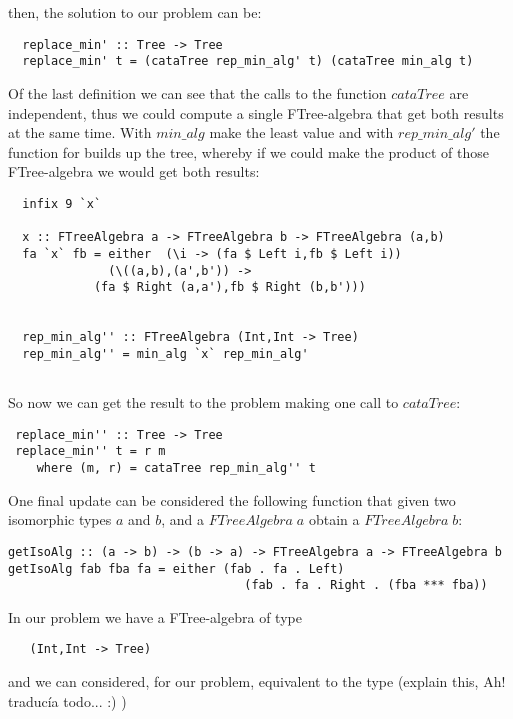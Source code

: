 \documentclass[a4paper,10pt]{article}
\begin{document}
\noindent then, the solution to our problem can be:

\begin{lstlisting}
  replace_min' :: Tree -> Tree
  replace_min' t = (cataTree rep_min_alg' t) (cataTree min_alg t) 
\end{lstlisting}

Of the last definition we can see that the calls to the function $cataTree$ are independent, thus
we could compute a single FTree-algebra that get both results at the same time. With $min\_alg$
make the least value and with $rep\_min\_alg'$ the function for builds up the tree, whereby if
we could make the product of those FTree-algebra we would get both results:

\begin{lstlisting}
  infix 9 `x`

  x :: FTreeAlgebra a -> FTreeAlgebra b -> FTreeAlgebra (a,b)
  fa `x` fb = either  (\i -> (fa $ Left i,fb $ Left i))
		      (\((a,b),(a',b')) -> 
			(fa $ Right (a,a'),fb $ Right (b,b')))
			  

  rep_min_alg'' :: FTreeAlgebra (Int,Int -> Tree)
  rep_min_alg'' = min_alg `x` rep_min_alg'
  
\end{lstlisting}

So now we can get the result to the problem making one call to $cataTree$:

\begin{lstlisting}
 replace_min'' :: Tree -> Tree
 replace_min'' t = r m
    where (m, r) = cataTree rep_min_alg'' t
\end{lstlisting}

One final update can be considered the following function that given two isomorphic types
$a$ and $b$, and a $FTreeAlgebra\;a$ obtain a $FTreeAlgebra\;b$:

\begin{lstlisting}
getIsoAlg :: (a -> b) -> (b -> a) -> FTreeAlgebra a -> FTreeAlgebra b
getIsoAlg fab fba fa = either (fab . fa . Left)
                                 (fab . fa . Right . (fba *** fba))
\end{lstlisting}

In our problem we have a FTree-algebra of type
  
\begin{lstlisting}
   (Int,Int -> Tree)
\end{lstlisting}

and we can considered, for our problem, equivalent to the type (explain this, Ah! traducía todo... :) )
\end{document}
